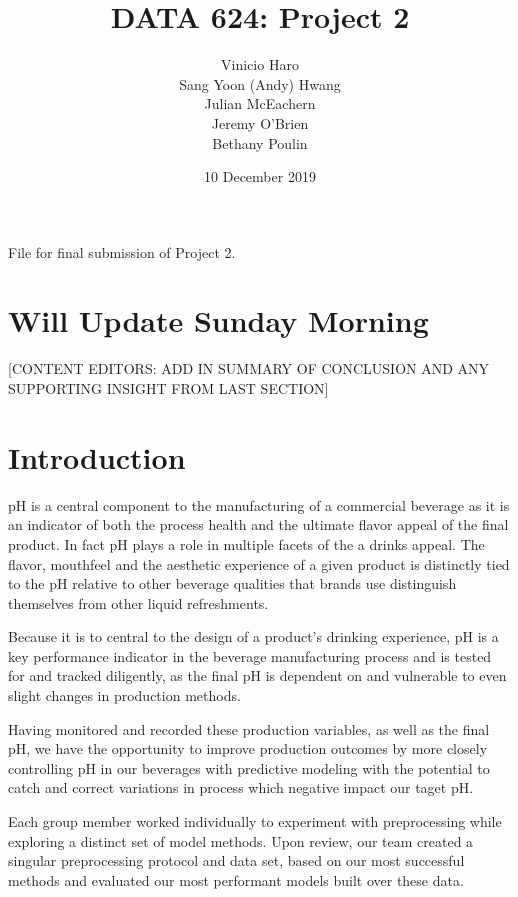 \documentclass[]{report}
\title{DATA 624: Project 2}
\author{Vinicio Haro \\ Sang Yoon (Andy) Hwang \\ Julian McEachern \\ Jeremy O'Brien \\ Bethany Poulin}
\date{10 December 2019}
\begin{document}
\maketitle

{
\setcounter{tocdepth}{1}
\tableofcontents
}
File for final submission of Project 2.

\thispagestyle{empty}
\newpage
\clearpage
{}

\hypertarget{will-update-sunday-morning}{%
\chapter{Will Update Sunday Morning}\label{will-update-sunday-morning}}

{[}CONTENT EDITORS: ADD IN SUMMARY OF CONCLUSION AND ANY SUPPORTING
INSIGHT FROM LAST SECTION{]}

\hypertarget{introduction}{%
\chapter{Introduction}\label{introduction}}

pH is a central component to the manufacturing of a commercial beverage
as it is an indicator of both the process health and the ultimate flavor
appeal of the final product. In fact pH plays a role in multiple facets
of the a drinks appeal. The flavor, mouthfeel and the aesthetic
experience of a given product is distinctly tied to the pH relative to
other beverage qualities that brands use distinguish themselves from
other liquid refreshments.

Because it is to central to the design of a product's drinking
experience, pH is a key performance indicator in the beverage
manufacturing process and is tested for and tracked diligently, as the
final pH is dependent on and vulnerable to even slight changes in
production methods.

Having monitored and recorded these production variables, as well as the
final pH, we have the opportunity to improve production outcomes by more
closely controlling pH in our beverages with predictive modeling with
the potential to catch and correct variations in process which negative
impact our taget pH.

Each group member worked individually to experiment with preprocessing
while exploring a distinct set of model methods. Upon review, our team
created a singular preprocessing protocol and data set, based on our
most successful methods and evaluated our most performant models built
over these data.
\end{document}
